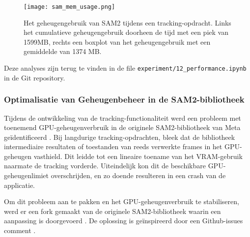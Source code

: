 \begin{figure}[H]
  \centering
  \texttt{[image: sam\_mem\_usage.png]}
  \caption[
Het geheugengebruik van SAM2 tijdens een tracking-opdracht
  ]{\label{fig:sam-mem-usage} 
  Het geheugengebruik van SAM2 tijdens een tracking-opdracht. Links het cumulatieve geheugengebruik doorheen de tijd met een piek van 1599MB, rechts een boxplot van het geheugengebruik met een gemiddelde van 1374 MB. }
\end{figure}

Deze analyses zijn terug te vinden in de file \texttt{experiment/12\_performance.ipynb} in de Git repository.

\subsubsection{Optimalisatie van Geheugenbeheer in de SAM2-bibliotheek}

Tijdens de ontwikkeling van de tracking-functionaliteit werd een probleem met 
toenemend GPU-geheugenverbruik in de originele SAM2-bibliotheek van Meta geïdentificeerd \autocite{Hu2024facebookresearch}. 
Bij langdurige tracking-opdrachten, bleek dat de bibliotheek intermediaire 
resultaten of toestanden van reeds verwerkte frames in het GPU-geheugen vasthield. 
Dit leidde tot een lineaire toename van het VRAM-gebruik naarmate de tracking vorderde. 
Uiteindelijk kon dit de beschikbare GPU-geheugenlimiet overschrijden, en zo doende resulteren in een crash van de applicatie. 

Om dit probleem aan te pakken en het GPU-geheugenverbruik te stabiliseren, we\-rd er een fork gemaakt van de originele 
SAM2-bibliotheek waarin een aanpassing is doorgevoerd \autocite{Hu2025ilianbronchart}.
De oplossing is geïnspireerd door een Github-issues comment \autocite{heyoeyo2024comment}. 

